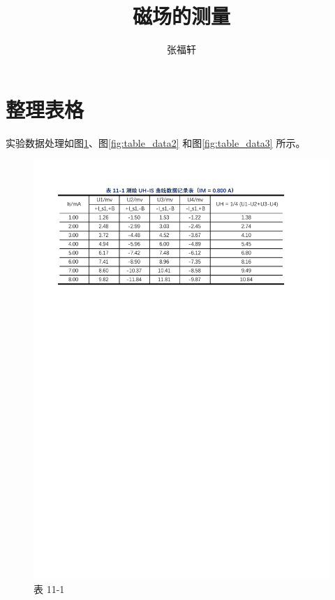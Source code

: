 \documentclass[12pt]{article}
\title{磁场的测量} %
\author{张福轩}
\begin{document}
\maketitle

\section{\normalfont 整理表格}
实验数据处理如图\ref{fig:table_data1}、图\ref{fig:table_data2} 和图\ref{fig:table_data3} 所示。

\begin{figure}[H] %
    \centering
    \includegraphics[width=\textwidth]{./figures/表11-1.pdf} 
    \caption{表 11-1}
    \label{fig:table_data1}
\end{figure}
\end{document}
